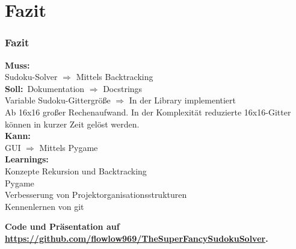 \documentclass{beamer}
\begin{document}
\section{Fazit}
\begin{frame}
	\frametitle{Fazit} 
	\textbf{Muss:} \\
	Sudoku-Solver $\Rightarrow$ Mittels Backtracking\\
	\textbf{Soll:}\
		Dokumentation $\Rightarrow$ Docstrings\\
		Variable Sudoku-Gittergröße $\Rightarrow$ In der Library implementiert\\
		Ab 16x16 großer Rechenaufwand. In der Komplexität reduzierte 16x16-Gitter\\ können in kurzer Zeit gelöst werden.\\
		\textbf{Kann: }\\
		GUI $\Rightarrow$ Mittels Pygame\\
		
		\textbf{Learnings:}\\
		Konzepte Rekursion und Backtracking\\
		Pygame\\
		Verbesserung von Projektorganisationsstrukturen\\
		Kennenlernen von git\\
	\end{frame}

\begin{frame}
\textbf{	Code und Präsentation auf \url{https://github.com/flowlow969/TheSuperFancySudokuSolver}.}
\end{frame}
\end{document}
